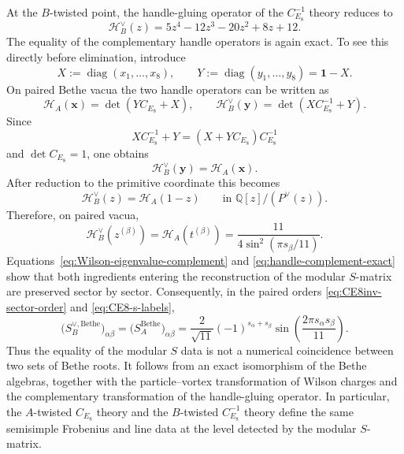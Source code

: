 \documentclass[11pt,a4paper]{article}
\numberwithin{equation}{section}
\begin{document}
At the $B$-twisted point, the handle-gluing operator of the $C_{E_8}^{-1}$ theory reduces to
\begin{equation}
  \mathcal H_B^\vee(z)
  =5z^4-12z^3-20z^2+8z+12.
  \label{eq:CE8inv-B-handle-polynomial}
\end{equation}
The equality of the complementary handle operators is again exact.  To see this directly before elimination, introduce
\begin{equation}
  X:=\operatorname{diag}(x_1,\ldots,x_8),
  \qquad
  Y:=\operatorname{diag}(y_1,\ldots,y_8)=\mathbf 1-X.
\end{equation}
On paired Bethe vacua the two handle operators can be written as
\begin{equation}
  \mathcal H_A(\boldsymbol x)=\det(YC_{E_8}+X),
  \qquad
  \mathcal H_B^\vee(\boldsymbol y)=\det(XC_{E_8}^{-1}+Y).
  \label{eq:handle-complement-determinants}
\end{equation}
Since
\begin{equation}
  XC_{E_8}^{-1}+Y
  =(X+YC_{E_8})C_{E_8}^{-1}
\end{equation}
and $\det C_{E_8}=1$, one obtains
\begin{equation}
  \mathcal H_B^\vee(\boldsymbol y)
  =\mathcal H_A(\boldsymbol x).
  \label{eq:handle-complement-full}
\end{equation}
After reduction to the primitive coordinate this becomes
\begin{equation}
  \mathcal H_B^\vee(z)
  =\mathcal H_A(1-z)
  \qquad
  \text{in }\mathbb Q[z]/(P^\vee(z)).
  \label{eq:handle-complement-exact}
\end{equation}
Therefore, on paired vacua,
\begin{equation}
  \mathcal H_B^\vee\!\left(z^{(\beta)}\right)
  =\mathcal H_A\!\left(t^{(\beta)}\right)
  =\frac{11}{4\sin^2(\pi s_\beta/11)}.
  \label{eq:CE8inv-handle-cyclotomic}
\end{equation}
Equations~\eqref{eq:Wilson-eigenvalue-complement} and \eqref{eq:handle-complement-exact} show that both ingredients entering the reconstruction of the modular $S$-matrix are preserved sector by sector.  Consequently, in the paired orders \eqref{eq:CE8inv-sector-order} and \eqref{eq:CE8-s-labels},
\begin{equation}
  \bigl(S_B^{\vee,\mathrm{Bethe}}\bigr)_{\alpha\beta}
  =\bigl(S_A^{\mathrm{Bethe}}\bigr)_{\alpha\beta}
  =\frac{2}{\sqrt{11}}
  (-1)^{s_\alpha+s_\beta}
  \sin\!\left(\frac{2\pi s_\alpha s_\beta}{11}\right).
  \label{eq:CE8inv-S-exact}
\end{equation}
Thus the equality of the modular $S$ data is not a numerical coincidence between two sets of Bethe roots.  It follows from an exact isomorphism of the Bethe algebras, together with the particle--vortex transformation of Wilson charges and the complementary transformation of the handle-gluing operator.  In particular, the $A$-twisted $C_{E_8}$ theory and the $B$-twisted $C_{E_8}^{-1}$ theory define the same semisimple Frobenius and line data at the level detected by the modular $S$-matrix.
\end{document}
